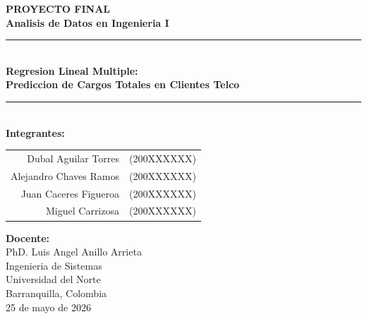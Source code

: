 \documentclass[12pt,a4paper]{article}
\begin{document}
\begin{titlepage}
    
    \vspace*{4cm}
    
    \begin{center}
        {\Huge\bfseries\textcolor{azuloscuro}{PROYECTO FINAL}}\\[0.5cm]
        {\LARGE\bfseries\textcolor{azulclaro}{Analisis de Datos en Ingenieria I}}\\[1cm]
        
        \rule{0.8\textwidth}{1.5pt}\\[0.8cm]
        
        {\Large\textbf{Regresion Lineal Multiple:}}\\[0.3cm]
        {\Large\textbf{Prediccion de Cargos Totales en Clientes Telco}}\\[1.5cm]
        
        \rule{0.6\textwidth}{0.5pt}\\[1cm]
        
        {\large\textbf{Integrantes:}}\\[0.5cm]
        \begin{tabular}{rl}
            Dubal Aguilar Torres & (200XXXXXX) \\
            Alejandro Chaves Ramos & (200XXXXXX) \\
            Juan Caceres Figueroa & (200XXXXXX) \\
            Miguel Carrizosa & (200XXXXXX) \\
        \end{tabular}
        
        \vfill
        
        {\large\textbf{Docente:}}\\[0.3cm]
        PhD. Luis Angel Anillo Arrieta\\[1cm]
        
        {\large Ingenieria de Sistemas}\\[0.3cm]
        {\large Universidad del Norte}\\[0.3cm]
        {\large Barranquilla, Colombia}\\[0.5cm]
        {\large 25 de mayo de 2026}
        
    \end{center}
\end{titlepage}
\end{document}
